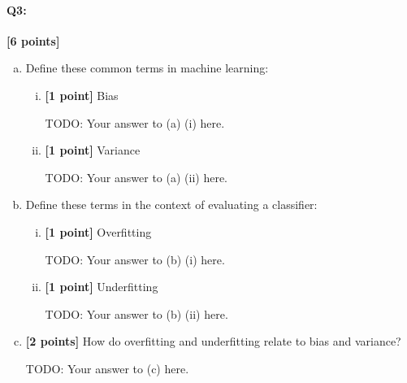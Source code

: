  



\pagebreak

\paragraph{Q3:} \textbf{[6 points]}

\begin{enumerate} [(a)]
    \item Define these common terms in machine learning:
    \begin{enumerate} [(i)]
    \item \textbf{[1 point]} Bias
    \begin{mdframed}
    TODO: Your answer to (a) (i) here.
    \end{mdframed}
    \item \textbf{[1 point]} Variance
    \begin{mdframed}
    TODO: Your answer to (a) (ii) here.
    \end{mdframed}
    \end{enumerate}
    \item Define these terms in the context of evaluating a classifier:
    
    \begin{enumerate} [(i)]
    \item \textbf{[1 point]} Overfitting
    \begin{mdframed}
    TODO: Your answer to (b) (i) here.
    \end{mdframed}
    \item \textbf{[1 point]} Underfitting
    \begin{mdframed}
    TODO: Your answer to (b) (ii) here.
    \end{mdframed}
    \end{enumerate}
    \item \textbf{[2 points]} How do overfitting and underfitting relate to bias and variance?
    \begin{mdframed}
    TODO: Your answer to (c) here.
    \end{mdframed}
\end{enumerate}



